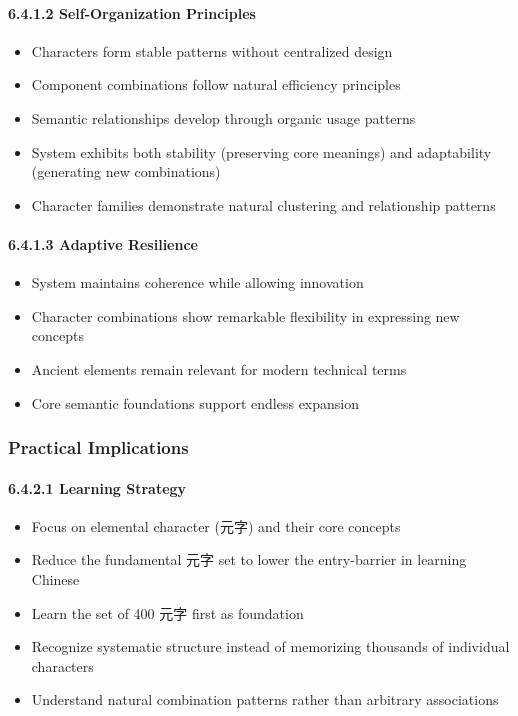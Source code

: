 \documentclass[11pt,letterpaper]{article}
\begin{document}
\paragraph{6.4.1.2 Self-Organization
Principles}\label{self-organization-principles}

\begin{itemize}
\tightlist
\item
  Characters form stable patterns without centralized design
\item
  Component combinations follow natural efficiency principles
\item
  Semantic relationships develop through organic usage patterns
\item
  System exhibits both stability (preserving core meanings) and
  adaptability (generating new combinations)
\item
  Character families demonstrate natural clustering and relationship
  patterns
\end{itemize}

\paragraph{6.4.1.3 Adaptive Resilience}\label{adaptive-resilience}

\begin{itemize}
\tightlist
\item
  System maintains coherence while allowing innovation
\item
  Character combinations show remarkable flexibility in expressing new
  concepts
\item
  Ancient elements remain relevant for modern technical terms
\item
  Core semantic foundations support endless expansion
\end{itemize}

\subsubsection{Practical Implications}\label{practical-implications}

\paragraph{6.4.2.1 Learning Strategy}\label{learning-strategy}

\begin{itemize}
\tightlist
\item
  Focus on elemental character (元字) and their core concepts
\item
  Reduce the fundamental 元字 set to lower the entry-barrier in learning
  Chinese
\item
  Learn the set of 400 元字 first as foundation
\item
  Recognize systematic structure instead of memorizing thousands of
  individual characters
\item
  Understand natural combination patterns rather than arbitrary
  associations
\end{itemize}
\end{document}
